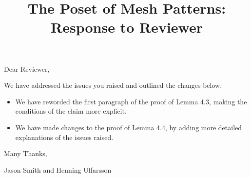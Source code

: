 \documentclass{article}
\title{The Poset of Mesh Patterns:\\ Response to Reviewer}
\author{}
\date{}
\begin{document}
	\maketitle
	
	Dear Reviewer,

\vskip 20pt

We have addressed the issues you raised and outlined the changes below.

\begin{itemize}
\item We have reworded the first paragraph of the proof of Lemma 4.3, making the conditions of the claim more explicit. 
\item We have made changes to the proof of Lemma 4.4, by adding more detailed explanations of the issues raised.
\end{itemize}
\vskip 20pt

Many Thanks,

Jason Smith and Henning Ulfarsson
\end{document}
